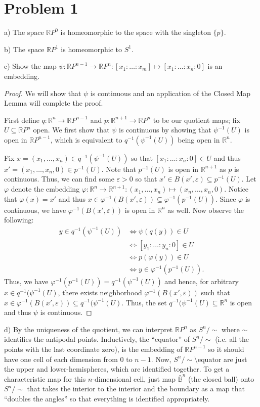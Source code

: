 \documentclass[11pt]{article} %
\newcommand{\R}{\mathbb{R}}
\begin{document}
\section*{Problem 1}
a) The space $\R P^0$ is homeomorphic to the space with the singleton $\{p\}$.

b) The space $\R P^1$ is homeomorphic to $S^1$.

c) Show the map $\psi:\R P^{n-1}\to \R P^n:[x_1:\ldots:x_m]\mapsto[x_1:\ldots:x_n:0]$ is an embedding.


\begin{proof}
We will show that $\psi$ is continuous and an application of the Closed Map Lemma will complete the proof.

First define $q:\R^n\to\R P^{n-1}$ and $p:\R^{n+1}\to \R P^n$ to be our quotient maps; fix $U\subseteq \R P^n$ open. We first show that $\psi$ is continuous by showing that $\psi^{-1}(U)$ is open in $\R P^{n-1}$, which is equivalent to $q^{-1}(\psi^{-1}(U))$ being open in $\R^n$. 

Fix $x = (x_1,\dots,x_n)\in q^{-1}(\psi^{-1}(U))$ so that $[x_1:\ldots:x_n:0]\in U$ and thus $x' = (x_1,\dots,x_n,0)\in p^{-1}(U)$. Note that $p^{-1}(U)$ is open in $\R^{n+1}$ as $p$ is continuous. Thus, we can find some $\varepsilon>0$ so that $x'\in B(x',\varepsilon)\subseteq p^{-1}(U)$. Let $\varphi$ denote the embedding $\varphi:\R^n\to\R^{n+1}:(x_1,\dots,x_n)\mapsto(x_n,\ldots,x_n,0)$. Notice that $\varphi(x) = x'$ and thus $x\in \varphi^{-1}(B(x',\varepsilon))\subseteq \varphi^{-1}(p^{-1}(U))$. Since $\varphi$ is continuous, we have $\varphi^{-1}(B(x',\varepsilon))$ is open in $\R^n$ as well. Now observe the following:
\begin{align*}
y\in q^{-1}(\psi^{-1}(U)) & \iff \psi(q(y))\in U \\
& \iff [y_1:\ldots:y_n:0]\in U \\
& \iff p(\varphi(y))\in U \\
& \iff y\in\varphi^{-1}(p^{-1}(U)).
\end{align*}
Thus, we have $\varphi^{-1}(p^{-1}(U)) = q^{-1}(\psi^{-1}(U))$ and hence, for arbitrary $x\in q^{-1}(\psi^{-1}(U)$, there exists neighborhood $\varphi^{-1}(B(x',\varepsilon))$ such that $x\in \varphi^{-1}(B(x',\varepsilon))\subseteq q^{-1}(\psi^{-1}(U)$. Thus, the set $q^{-1}(\psi^{-1}(U)\subseteq \R^n$ is open and thus $\psi$ is continuous.
\end{proof}

d) By the uniqueness of the quotient, we can interpret $\R P^n$ as $S^n/\sim$ where $\sim$ identifies the antipodal points. Inductively, the ``equator'' of $S^n/\sim$ (i.e. all the points with the last coordinate zero), is the embedding of $\R P^{n-1}$ so it should have one cell of each dimension from $0$ to $n-1$. Now, $S^n/\sim \setminus \text{equator}$ are just the upper and lower-hemispheres, which are identified together. To get a characteristic map for this $n$-dimensional cell, just map $\bar{\mathbb{B}}^n$ (the closed ball) onto $S^n/\sim$ that takes the interior to the interior and the boundary as a map that ``doubles the angles'' so that everything is identified appropriately.
\end{document}

